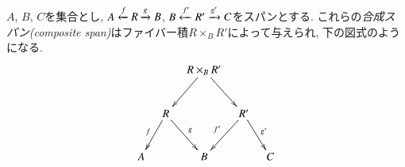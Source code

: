 \begin{definition}\label{def:composite span}

$A$, $B$, $C$を集合とし, $A\xleftarrow{f}R\xrightarrow{g}B$, $B\xleftarrow{f'}R'\xrightarrow{g'}C$をスパンとする. これらの\emph{合成スパン(composite span)}はファイバー積$R\times_BR'$によって与えられ, 下の図式のようになる.
$$
\xymatrix@=10pt{&&R\times_BR'\ar[ldd]\ar[rdd]\\\\&R\ar[ddl]_f\ar[ddr]^g&&R'\ar[ddl]_{f'}\ar[ddr]^{g'}\\\\A&&B&&C
}$$

\end{definition}

